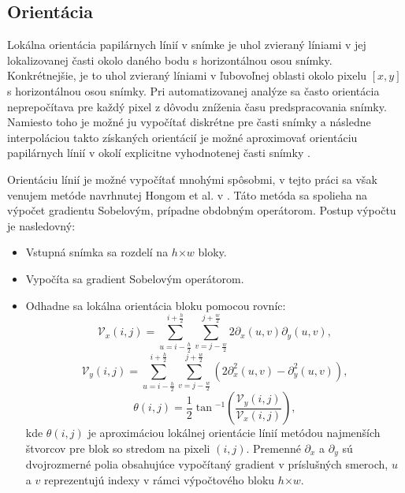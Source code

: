   \subsection{Orientácia} \label{sec:orientacia}
  Lokálna orientácia papilárnych línií v snímke je uhol zvieraný líniami v jej lokalizovanej časti okolo daného bodu
  s horizontálnou osou snímky. Konkrétnejšie, je to uhol zvieraný líniami v ľubovoľnej oblasti okolo pixelu $[x,y]$ s
  horizontálnou osou snímky. Pri automatizovanej analýze sa často orientácia neprepočítava pre každý pixel z dôvodu zníženia času predspracovania snímky.
  Namiesto toho je možné ju vypočítať diskrétne pre časti snímky a následne interpoláciou takto získaných orientácií je možné aproximovať
  orientáciu papilárnych línií v okolí explicitne vyhodnotenej časti snímky \cite{Handbook}.

  Orientáciu línií je možné vypočítať mnohými spôsobmi, v tejto práci sa však venujem metóde navrhnutej Hongom et al. v \cite{Hong}.
  Táto metóda sa spolieha na výpočet gradientu Sobelovým, prípadne obdobným operátorom. Postup výpočtu je nasledovný:
  \begin{itemize}
    \item Vstupná snímka sa rozdelí na $h$$\times{}$$w$ bloky.
    \item Vypočíta sa gradient Sobelovým operátorom.
    \item Odhadne sa lokálna orientácia bloku pomocou rovníc:
          \begin{equation}
            \mathcal{V}_x(i,j) = \sum_{u=i-\frac{h}{2}}^{i+\frac{h}{2}}\sum_{v=j-\frac{w}{2}}^{j+\frac{w}{2}} 2\partial _{x}(u,v) \partial _y(u,v),
          \end{equation}
          \begin{equation}
            \mathcal{V}_y(i,j) = \sum_{u=i-\frac{h}{2}}^{i+\frac{h}{2}}\sum_{v=j-\frac{w}{2}}^{j+\frac{w}{2}} (2\partial ^{2}_{x}(u,v) - \partial ^{2}_{y}(u,v)),
          \end{equation}
          \begin{equation}
            \theta{}(i,j) = \frac{1}{2}\tan{}^{-1}(\frac{\mathcal{V}_y(i,j)}{\mathcal{V}_x(i,j)}),
          \end{equation}
          kde $\theta{}(i,j)$ je aproximáciou lokálnej orientácie línií metódou najmenších štvorcov pre blok so stredom na pixeli $(i,j)$. Premenné
          $\partial _{x}$ a $\partial _{y}$ sú dvojrozmerné polia obsahujúce vypočítaný gradient v príslušných smeroch, $u$ a $v$ reprezentujú indexy v rámci
          výpočtového bloku $h$$\times{}$$w$.
  \end{itemize}

